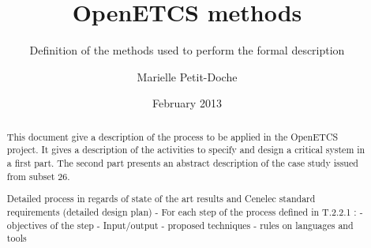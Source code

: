 \documentclass{template/openetcs_article}
\begin{document}
\frontmatter
{}




\title{OpenETCS methods}

\subtitle{ Definition of the methods used to perform the formal description}

\date{February 2013}


\author{Marielle Petit-Doche}
  
  



\begin{abstract}
This document give a description of the process to be applied in the OpenETCS project. It gives a description of the activities to specify and design a critical system in a first part. The second part presents an abstract description of the case study issued from subset 26.


Detailed process in regards of state of the art results and Cenelec standard requirements  (detailed design plan)
- For each step  of the process defined in T.2.2.1 :
           - objectives of the step
           - Input/output
           - proposed techniques
- rules on languages and tools

\end{abstract}

\maketitle
\tableofcontents
\listoffiguresandtables
\newpage



\newcommand{\tbd}{\colorbox{cyan}{\%\%To Be Defined\%\%}}
\newcommand{\tbc}{\colorbox{cyan}{\%\%To Be Confirmed\%\%}}
\newcommand{\todo}[1]{\colorbox{cyan}{\%\%{#1}\%\%}}
\newlength{\origindent}
\end{document}
